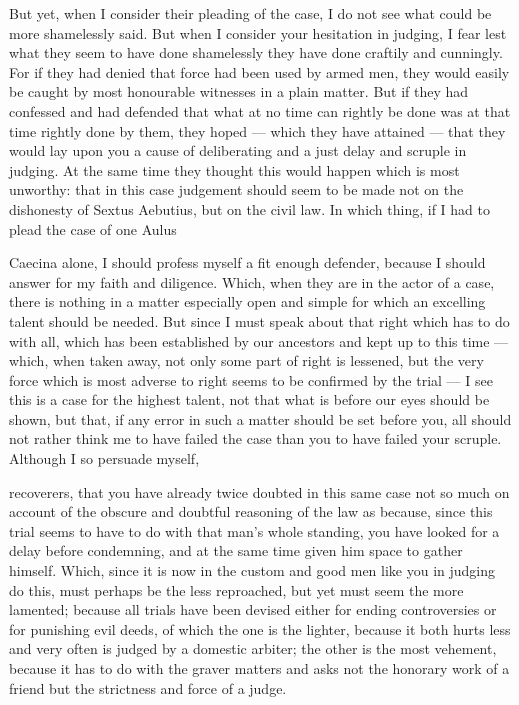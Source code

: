  But yet, when I consider their pleading of the case, I do not see what could be more shamelessly said. But when I consider your hesitation in judging, I fear lest what they seem to have done shamelessly they have done craftily and cunningly. For if they had denied that force had been used by armed men, they would easily be caught by most honourable witnesses in a plain matter. But if they had confessed and had defended that what at no time can rightly be done was at that time rightly done by them, they hoped --- which they have attained --- that they would lay upon you a cause of deliberating and a just delay and scruple in judging. At the same time they thought this would happen which is most unworthy: that in this case judgement should seem to be made not on the dishonesty of Sextus Aebutius, but on the civil law. In which thing, if I had to plead the case of one Aulus

 Caecina alone, I should profess myself a fit enough defender, because I should answer for my faith and diligence. Which, when they are in the actor of a case, there is nothing in a matter especially open and simple for which an excelling talent should be needed. But since I must speak about that right which has to do with all, which has been established by our ancestors and kept up to this time --- which, when taken away, not only some part of right is lessened, but the very force which is most adverse to right seems to be confirmed by the trial --- I see this is a case for the highest talent, not that what is before our eyes should be shown, but that, if any error in such a matter should be set before you, all should not rather think me to have failed the case than you to have failed your scruple. Although I so persuade myself,

 recoverers, that you have already twice doubted in this same case not so much on account of the obscure and doubtful reasoning of the law as because, since this trial seems to have to do with that man's whole standing, you have looked for a delay before condemning, and at the same time given him space to gather himself. Which, since it is now in the custom and good men like you in judging do this, must perhaps be the less reproached, but yet must seem the more lamented; because all trials have been devised either for ending controversies or for punishing evil deeds, of which the one is the lighter, because it both hurts less and very often is judged by a domestic arbiter; the other is the most vehement, because it has to do with the graver matters and asks not the honorary work of a friend but the strictness and force of a judge.

